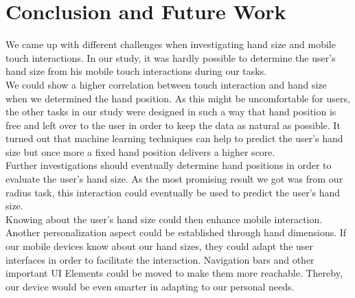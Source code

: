\documentclass{sigchi}
\begin{document}
\section{Conclusion and Future Work}
We came up with different challenges when investigating hand size and mobile touch interactions. In our study, it was hardly possible to determine the user's hand size from his mobile touch interactions during our tasks.\\
We could show a higher correlation between touch interaction and hand size when we determined the hand position. As this might be uncomfortable for users, the other tasks in our study were designed in such a way that hand position is free and left over to the user in order to keep the data as natural as possible. It turned out that machine learning techniques can help to predict the user's hand size but once more a fixed hand position delivers a higher score.\\
Further investigations should eventually determine hand positions in order to evaluate the user's hand size. As the most promising result we got was from our radius task, this interaction could eventually be used to predict the user's hand size.\\ 
Knowing about the user's hand size could then enhance mobile interaction. Another personalization aspect could be established through hand dimensions. If our mobile devices know about our hand sizes, they could adapt the user interfaces in order to facilitate the interaction. Navigation bars and other important UI Elements could be moved to make them more reachable. Thereby, our device would be even smarter in adapting to our personal needs.




%
%
%
%
%


\balance{}



%

%
\end{document}
